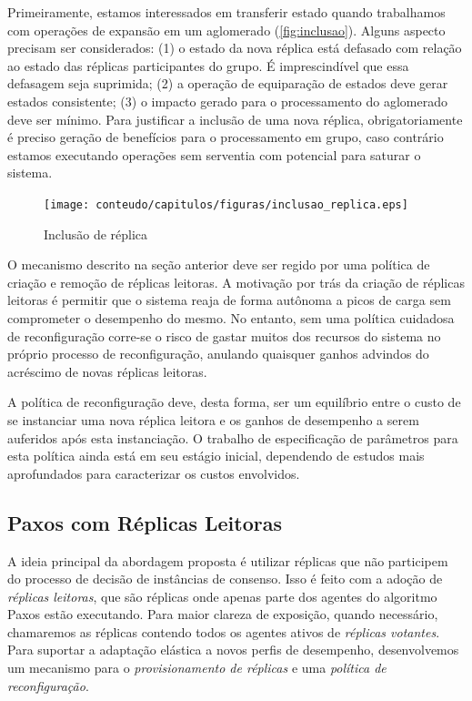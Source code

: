 Primeiramente, estamos interessados em transferir estado quando trabalhamos com operações
de expansão em um aglomerado (\autoref{fig:inclusao}). Alguns aspecto precisam ser
considerados: (1) o estado da nova réplica está defasado com relação ao estado das
réplicas participantes do grupo. É imprescindível que essa defasagem seja suprimida; (2) a
operação de equiparação de estados deve gerar estados consistente; (3) o impacto gerado
para o processamento do aglomerado deve ser mínimo. Para justificar a inclusão de uma nova
réplica, obrigatoriamente é preciso geração de benefícios para o processamento em grupo,
caso contrário estamos executando operações sem serventia com potencial para saturar o
sistema.

\begin{figure}[ht]
  \centering
  \texttt{[image: conteudo/capitulos/figuras/inclusao\_replica.eps]}
  \caption{Inclusão de réplica}
  \label{fig:inclusao}
\end{figure}

O mecanismo descrito na seção anterior deve ser regido por uma política de criação e
remoção de réplicas leitoras. A  motivação por trás da criação de réplicas leitoras é
permitir que o sistema reaja de forma autônoma a picos de carga sem comprometer o
desempenho do mesmo. No entanto, sem uma política cuidadosa de reconfiguração corre-se o
risco de gastar muitos dos recursos do sistema no próprio processo de reconfiguração,
anulando quaisquer ganhos advindos do acréscimo de novas réplicas leitoras.

A política de reconfiguração deve, desta forma, ser um equilíbrio entre o custo de se
instanciar uma nova réplica leitora e os ganhos de desempenho a serem auferidos após esta
instanciação. O trabalho de especificação de parâmetros para esta política ainda está em
seu estágio inicial, dependendo de estudos mais aprofundados para caracterizar os custos
envolvidos.

\subsection{Paxos com Réplicas Leitoras}

A ideia principal da abordagem proposta é utilizar réplicas que não participem do processo
de decisão de instâncias de consenso. Isso é feito com a adoção de \emph{réplicas
leitoras}, que são réplicas onde apenas parte dos agentes do algoritmo Paxos estão
executando. Para maior clareza de exposição, quando necessário, chamaremos as réplicas
contendo todos os agentes ativos de \emph{réplicas votantes}. Para suportar a adaptação
elástica a novos perfis de desempenho, desenvolvemos um mecanismo para o
\emph{provisionamento de réplicas} e uma \emph{política de reconfiguração}.

